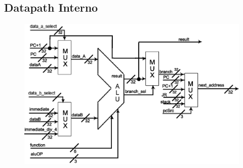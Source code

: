 \begin{center}
\begin{longtable}[pos]{| l | c | c | m{7cm} |}

		\end{longtable}
	\end{center}
	
\newpage	
	
	\subsection{Datapath Interno}
	
	\begin{figure}[ht]
		\begin{center}
		\includegraphics[scale = 0.8]{./datapath/stage3.eps}
		\end{center}
	\end{figure}
